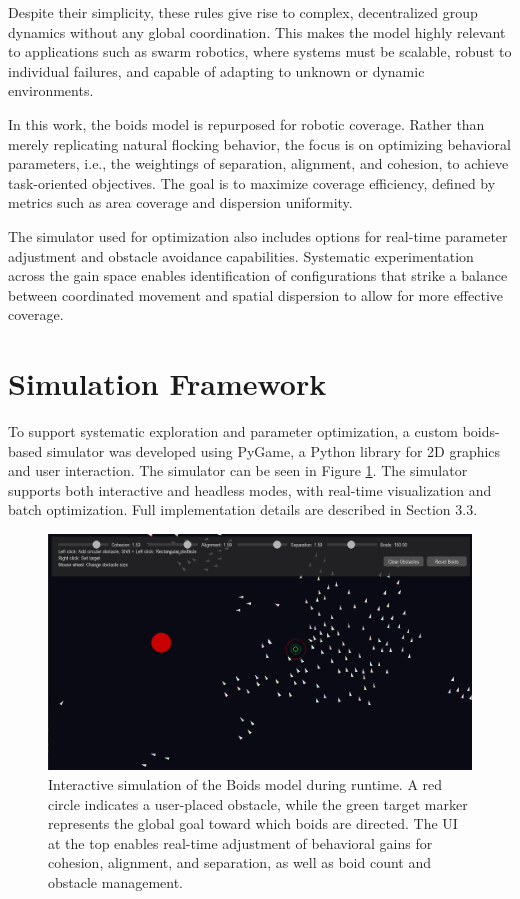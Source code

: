 \documentclass[12pt]{article}
\begin{document}
Despite their simplicity, these rules give rise to complex, decentralized group dynamics without any global coordination. This makes the model highly relevant to applications such as swarm robotics, where systems must be scalable, robust to individual failures, and capable of adapting to unknown or dynamic environments.

In this work, the boids model is repurposed for robotic coverage. Rather than merely replicating natural flocking behavior, the focus is on optimizing behavioral parameters, i.e., the weightings of separation, alignment, and cohesion, to achieve task-oriented objectives. The goal is to maximize coverage efficiency, defined by metrics such as area coverage and dispersion uniformity.

The simulator used for optimization also includes options for real-time parameter adjustment and obstacle avoidance capabilities. Systematic experimentation across the gain space enables identification of configurations that strike a balance between coordinated movement and spatial dispersion to allow for more effective coverage.

\section{Simulation Framework}

To support systematic exploration and parameter optimization, a custom boids-based simulator was developed using PyGame, a Python library for 2D graphics and user interaction. The simulator can be seen in Figure \ref{fig:boids_sim}. The simulator supports both interactive and headless modes, with real-time visualization and batch optimization. Full implementation details are described in Section 3.3.

\begin{figure}[h!]
    \centering
    \includegraphics[width=0.7\linewidth]{boids_sim.png}
    \caption{Interactive simulation of the Boids model during runtime. A red circle indicates a user-placed obstacle, while the green target marker represents the global goal toward which boids are directed. The UI at the top enables real-time adjustment of behavioral gains for cohesion, alignment, and separation, as well as boid count and obstacle management.}
    \label{fig:boids_sim}
  \end{figure}
\end{document}
